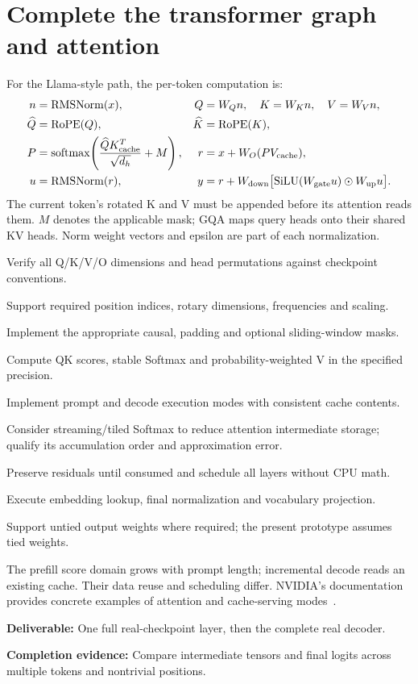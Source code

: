 \documentclass[11pt,a4paper]{article}
\newcommand{\phase}[2]{\clearpage\section{#1}\label{#2}}
\newcommand{\deliver}[2]{\begin{tcolorbox}[colback=pale,colframe=line,boxrule=0.5pt,arc=1mm,left=8pt,right=8pt,top=6pt,bottom=6pt]\textbf{Deliverable:} #1\par\textbf{Completion evidence:} #2\end{tcolorbox}}
\begin{document}
\phase{Complete the transformer graph and attention}{sec:attention}
For the Llama-style path, the per-token computation is:
\begin{align*}
n &= \operatorname{RMSNorm}(x), & Q&=W_Qn,\quad K=W_Kn,\quad V=W_Vn,\\
\widehat Q&=\operatorname{RoPE}(Q), &\widehat K&=\operatorname{RoPE}(K),\\
P&=\operatorname{softmax}\!\left(\frac{\widehat Q K_{\rm cache}^{T}}{\sqrt{d_h}}+M\right),
&r&=x+W_O(PV_{\rm cache}),\\
u&=\operatorname{RMSNorm}(r), & y&=r+W_{\rm down}\bigl[\operatorname{SiLU}(W_{\rm gate}u)\odot W_{\rm up}u\bigr].
\end{align*}
The current token's rotated K and V must be appended before its attention reads
them. $M$ denotes the applicable mask; GQA maps query heads onto their shared KV
heads. Norm weight vectors and epsilon are part of each normalization.
\begin{checklist}
\item Verify all Q/K/V/O dimensions and head permutations against checkpoint conventions.
\item Support required position indices, rotary dimensions, frequencies and scaling.
\item Implement the appropriate causal, padding and optional sliding-window masks.
\item Compute QK scores, stable Softmax and probability-weighted V in the specified precision.
\item Implement prompt and decode execution modes with consistent cache contents.
\item Consider streaming/tiled Softmax to reduce attention intermediate storage;
qualify its accumulation order and approximation error.
\item Preserve residuals until consumed and schedule all layers without CPU math.
\item Execute embedding lookup, final normalization and vocabulary projection.
\item Support untied output weights where required; the present prototype assumes tied weights.
\end{checklist}
The prefill score domain grows with prompt length; incremental decode reads an
existing cache. Their data reuse and scheduling differ. NVIDIA's documentation
provides concrete examples of attention and cache-serving modes~\cite{attention}.
\deliver{One full real-checkpoint layer, then the complete real decoder.}{Compare
intermediate tensors and final logits across multiple tokens and nontrivial positions.}
\end{document}
